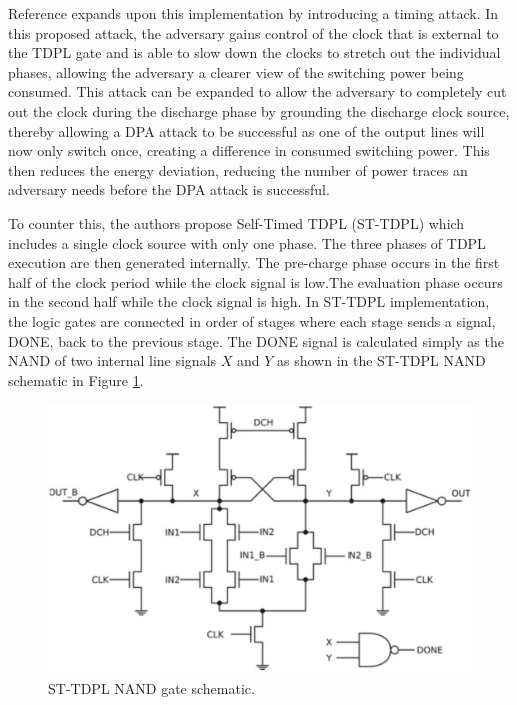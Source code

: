 \documentclass[conference, 12pt]{IEEEtran}
\newcommand{\x}{1}						%
\begin{document}
			Reference \cite{b2} expands upon this implementation by introducing a timing attack. In this proposed attack, the adversary gains control of the clock that is external to the TDPL gate and is able to slow down the clocks to stretch out the individual phases, allowing the adversary a clearer view of the switching power being consumed. This attack can be expanded to allow the adversary to completely cut out the clock during the discharge phase by grounding the discharge clock source, thereby allowing a DPA attack to be successful as one of the output lines will now only switch once, creating a difference in consumed switching power. This then reduces the energy deviation, reducing the number of power traces an adversary needs before the DPA attack is successful.

			To counter this, the authors propose Self-Timed TDPL (ST-TDPL) which includes a single clock source with only one phase. The three phases of TDPL execution are then generated internally. The pre-charge phase occurs in the first half of the clock period while the clock signal is low.The evaluation phase occurs in the second half while the clock signal is high. In ST-TDPL implementation, the logic gates are connected in order of stages where each stage sends a signal, DONE, back to the previous stage. The DONE signal is calculated simply as the NAND of two internal line signals $X$ and $Y$ as shown in the ST-TDPL NAND schematic in Figure \ref{ST-TDPL_NAND}.

			\begin{figure}[tbp]
				\centering
				\includegraphics[width=\x\linewidth]{ReportFiles/ST-TDPL_NAND.png}
				\caption{ST-TDPL NAND gate schematic.\cite{b2}}
				\label{ST-TDPL_NAND}
			\end{figure}
\end{document}
